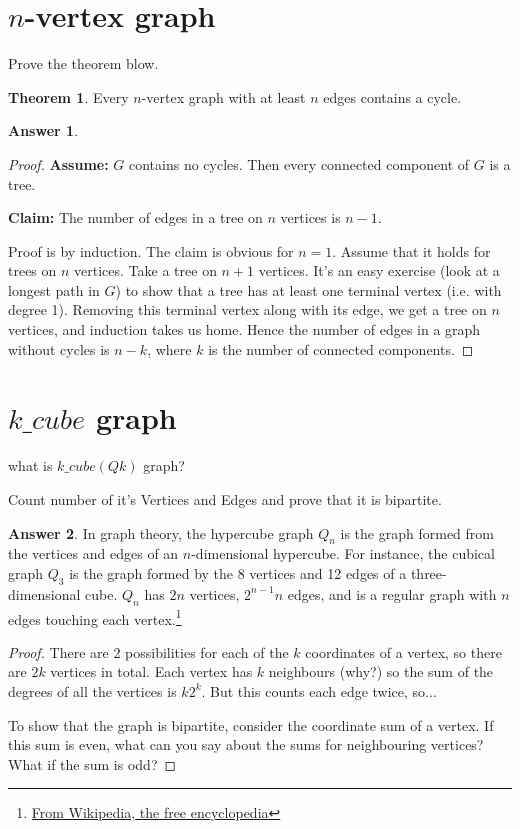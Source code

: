 \documentclass[a4paper]{article}
\renewcommand{\(}{\left(}
\renewcommand{\)}{\right)}
\theoremstyle{plain}
\theoremstyle{plain}
\theoremstyle{definition}
\newtheorem*{answer}{Answer}
\newtheorem{theorem}{Theorem}[section]
\begin{document}
\section{$n$-vertex graph}
Prove the theorem blow.
\begin{theorem}
Every $n$-vertex graph with at least $n$ edges contains a cycle.
\end{theorem}
\begin{shaded}
\begin{answer}
\begin{proof}
\textbf{Assume:} $G$ contains no cycles. Then every connected component of $G$ is a tree.

 \textbf{Claim:} The number of edges in a tree on $n$ vertices is $n-1$.

Proof is by induction. The claim is obvious for $n=1$. Assume that it holds for trees on $n$ vertices. Take a tree on $n+1$ vertices. It's an easy exercise (look at a longest path in $G$) to show that a tree has at least one terminal vertex  (i.e. with degree 1). Removing this terminal vertex along with its edge, we get a tree on $n$ vertices, and induction takes us home. Hence the number of edges in a graph without cycles is $n-k$, where $k$ is the number of connected components.
\end{proof}
\end{answer}
\end{shaded}




\section{$k\_cube$ graph}
what is $k\_cube(Qk)$ graph?

Count number of it's Vertices and Edges and prove that it is bipartite.
\begin{shaded}
\begin{answer}
In graph theory, the hypercube graph $Q_n$ is the graph formed from the vertices and edges of an $n$-dimensional hypercube. For instance, the cubical graph $Q_3$ is the graph formed by the 8 vertices and 12 edges of a three-dimensional cube. $Q_n$ has $2n$ vertices, $2^{n-1}n$ edges, and is a regular graph with $n$ edges touching each vertex.\footnote{ \href{https://en.wikipedia.org/wiki/Hypercube_graph}{From Wikipedia, the free encyclopedia}}
\begin{proof}
There are 2 possibilities for each of the $k$ coordinates of a vertex, so there are $2k$ vertices in total. Each vertex has $k$ neighbours (why?) so the sum of the degrees of all the vertices is $k2^k$. But this counts each edge twice, so...

To show that the graph is bipartite, consider the coordinate sum of a vertex. If this sum is even, what can you say about the sums for neighbouring vertices? What if the sum is odd?
\end{proof}
\end{answer}
\end{shaded}
\end{document}
